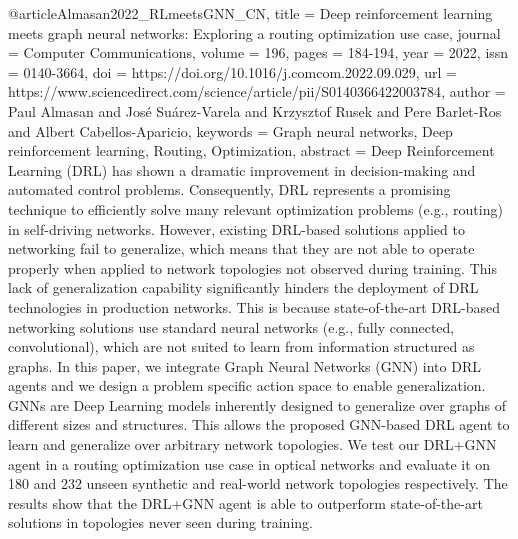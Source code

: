 {%
@article{Almasan2022_RLmeetsGNN_CN,
title = {{Deep reinforcement learning meets graph neural networks: Exploring a routing optimization use case}},
journal = {Computer Communications},
volume = {196},
pages = {184-194},
year = {2022},
issn = {0140-3664},
doi = {https://doi.org/10.1016/j.comcom.2022.09.029},
url = {https://www.sciencedirect.com/science/article/pii/S0140366422003784},
author = {Paul Almasan and José Suárez-Varela and Krzysztof Rusek and Pere Barlet-Ros and Albert Cabellos-Aparicio},
keywords = {Graph neural networks, Deep reinforcement learning, Routing, Optimization},
abstract = {Deep Reinforcement Learning (DRL) has shown a dramatic improvement in decision-making and automated control problems. Consequently, DRL represents a promising technique to efficiently solve many relevant optimization problems (e.g., routing) in self-driving networks. However, existing DRL-based solutions applied to networking fail to generalize, which means that they are not able to operate properly when applied to network topologies not observed during training. This lack of generalization capability significantly hinders the deployment of DRL technologies in production networks. This is because state-of-the-art DRL-based networking solutions use standard neural networks (e.g., fully connected, convolutional), which are not suited to learn from information structured as graphs. In this paper, we integrate Graph Neural Networks (GNN) into DRL agents and we design a problem specific action space to enable generalization. GNNs are Deep Learning models inherently designed to generalize over graphs of different sizes and structures. This allows the proposed GNN-based DRL agent to learn and generalize over arbitrary network topologies. We test our DRL+GNN agent in a routing optimization use case in optical networks and evaluate it on 180 and 232 unseen synthetic and real-world network topologies respectively. The results show that the DRL+GNN agent is able to outperform state-of-the-art solutions in topologies never seen during training.}
}


}

